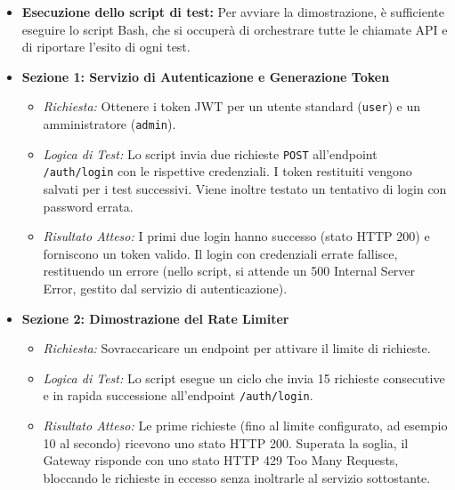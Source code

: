 \begin{itemize}
    \item \textbf{Esecuzione dello script di test:} Per avviare la dimostrazione, è sufficiente eseguire lo script Bash, che si occuperà di orchestrare tutte le chiamate API e di riportare l'esito di ogni test.
    \item \textbf{Sezione 1: Servizio di Autenticazione e Generazione Token}
    \begin{itemize}
        \item \textit{Richiesta:} Ottenere i token JWT per un utente standard (\texttt{user}) e un amministratore (\texttt{admin}).
        \item \textit{Logica di Test:} Lo script invia due richieste \texttt{POST} all'endpoint \texttt{/auth/login} con le rispettive credenziali. I token restituiti vengono salvati per i test successivi. Viene inoltre testato un tentativo di login con password errata.
        \item \textit{Risultato Atteso:} I primi due login hanno successo (stato HTTP 200) e forniscono un token valido. Il login con credenziali errate fallisce, restituendo un errore (nello script, si attende un 500 Internal Server Error, gestito dal servizio di autenticazione).
    \end{itemize}
    
    \item \textbf{Sezione 2: Dimostrazione del Rate Limiter}
    \begin{itemize}
        \item \textit{Richiesta:} Sovraccaricare un endpoint per attivare il limite di richieste.
        \item \textit{Logica di Test:} Lo script esegue un ciclo che invia 15 richieste consecutive e in rapida successione all'endpoint \texttt{/auth/login}.
        \item \textit{Risultato Atteso:} Le prime richieste (fino al limite configurato, ad esempio 10 al secondo) ricevono uno stato HTTP 200. Superata la soglia, il Gateway risponde con uno stato HTTP 429 Too Many Requests, bloccando le richieste in eccesso senza inoltrarle al servizio sottostante.
    \end{itemize}


\end{itemize}
